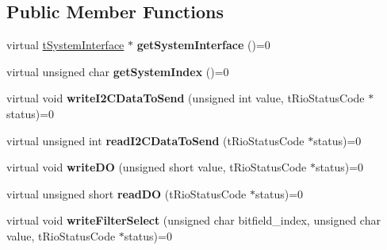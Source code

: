 \subsection*{Public Member Functions}
\begin{DoxyCompactItemize}
\item 
\hypertarget{classnFPGA_1_1nFRC__2012__1__6__4_1_1tDIO_a9479bfa278e40c90a6dd6942abeb7c6d}{
virtual \hyperlink{classnFPGA_1_1tSystemInterface}{tSystemInterface} $\ast$ {\bfseries getSystemInterface} ()=0}
\label{classnFPGA_1_1nFRC__2012__1__6__4_1_1tDIO_a9479bfa278e40c90a6dd6942abeb7c6d}

\item 
\hypertarget{classnFPGA_1_1nFRC__2012__1__6__4_1_1tDIO_a69c1ec44ab2800485708a8cb47e01288}{
virtual unsigned char {\bfseries getSystemIndex} ()=0}
\label{classnFPGA_1_1nFRC__2012__1__6__4_1_1tDIO_a69c1ec44ab2800485708a8cb47e01288}

\item 
\hypertarget{classnFPGA_1_1nFRC__2012__1__6__4_1_1tDIO_a2e48b744d11460777a0ef558503b871c}{
virtual void {\bfseries writeI2CDataToSend} (unsigned int value, tRioStatusCode $\ast$status)=0}
\label{classnFPGA_1_1nFRC__2012__1__6__4_1_1tDIO_a2e48b744d11460777a0ef558503b871c}

\item 
\hypertarget{classnFPGA_1_1nFRC__2012__1__6__4_1_1tDIO_afc578c0877aa6f6e64a19ee58b007b0d}{
virtual unsigned int {\bfseries readI2CDataToSend} (tRioStatusCode $\ast$status)=0}
\label{classnFPGA_1_1nFRC__2012__1__6__4_1_1tDIO_afc578c0877aa6f6e64a19ee58b007b0d}

\item 
\hypertarget{classnFPGA_1_1nFRC__2012__1__6__4_1_1tDIO_a22bfa720df72de9fd497e2cdfb281f9d}{
virtual void {\bfseries writeDO} (unsigned short value, tRioStatusCode $\ast$status)=0}
\label{classnFPGA_1_1nFRC__2012__1__6__4_1_1tDIO_a22bfa720df72de9fd497e2cdfb281f9d}

\item 
\hypertarget{classnFPGA_1_1nFRC__2012__1__6__4_1_1tDIO_ae71f7cdd43b4669036f8d86b28ba3683}{
virtual unsigned short {\bfseries readDO} (tRioStatusCode $\ast$status)=0}
\label{classnFPGA_1_1nFRC__2012__1__6__4_1_1tDIO_ae71f7cdd43b4669036f8d86b28ba3683}

\item 
\hypertarget{classnFPGA_1_1nFRC__2012__1__6__4_1_1tDIO_a6cc01f80d91a29bd5e734b24ea98c592}{
virtual void {\bfseries writeFilterSelect} (unsigned char bitfield\_\-index, unsigned char value, tRioStatusCode $\ast$status)=0}
\label{classnFPGA_1_1nFRC__2012__1__6__4_1_1tDIO_a6cc01f80d91a29bd5e734b24ea98c592}


\end{DoxyCompactItemize}
